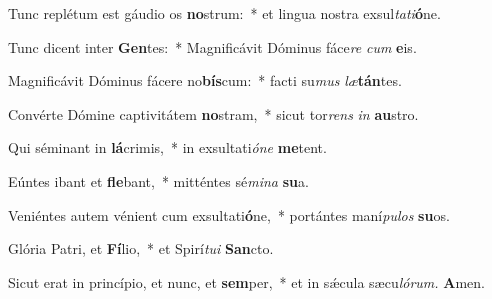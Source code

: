 \item Tunc replétum est gáudio os \textbf{no}strum:~* et lingua nostra exsul\textit{tati}\textbf{ó}ne.
\item Tunc dicent inter \textbf{Gen}tes:~* Magnificávit Dóminus fáce\textit{re} \textit{cum} \textbf{e}is.
\item Magnificávit Dóminus fácere no\textbf{bís}cum:~* facti su\textit{mus} \textit{læ}\textbf{tán}tes.
\item Convérte Dómine ca\-ptivitátem \textbf{no}stram,~* sicut tor\textit{rens} \textit{in} \textbf{au}stro.
\item Qui séminant in \textbf{lá}crimis,~* in exsultati\hspace*{0.02em}\textit{óne} \textbf{me}tent.
\item Eúntes ibant et \textbf{fle}bant,~* mitténtes sé\textit{mina} \textbf{su}a.
\item Veniéntes autem vénient cum exsultati\textbf{ó}ne,~* portántes maní\hspace*{0.02em}\textit{pulos} \textbf{su}os.
\item Glória Patri, et \textbf{Fí}lio,~* et Spirí\tinyhspace\textit{tui} \textbf{San}cto.
\item Sicut erat in princípio, et nunc, et \textbf{sem}per,~* et in sǽcula sæcu\tinyhspace\textit{lórum.} \textbf{A}men.